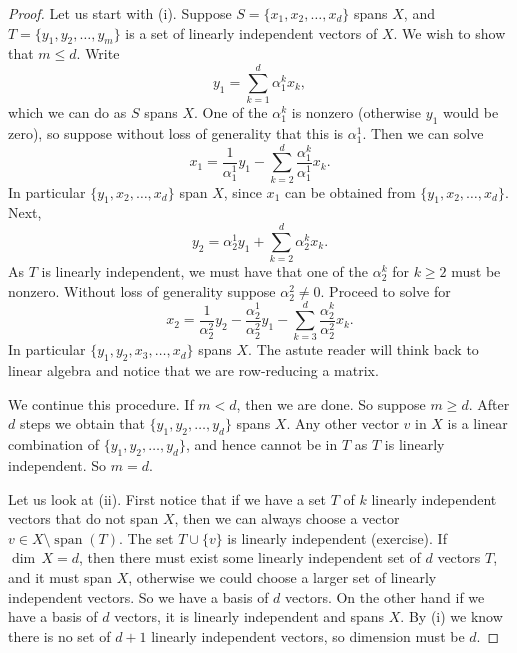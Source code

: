 \documentclass[12pt]{book}
\newcommand{\spn}{\operatorname{span}}
\theoremstyle{plain}
\theoremstyle{remark}
\theoremstyle{definition}
\theoremstyle{exercise}
\theoremstyle{example}
\begin{document}
\begin{proof}
Let us start with (i).
Suppose $S = \{ x_1 , x_2, \ldots, x_d \}$ spans $X$, and
$T = \{ y_1, y_2, \ldots, y_m \}$ is a set of linearly independent
vectors of $X$.  We wish to show that $m \leq d$.
Write
\begin{equation*}
y_1 = \sum_{k=1}^d \alpha_1^k x_k ,
\end{equation*}
which we can do as $S$ spans $X$.  One of the
$\alpha_1^k$ is nonzero (otherwise $y_1$ would be zero),
so suppose without loss of generality that this
is $\alpha_1^1$.  Then we can solve
\begin{equation*}
x_1 = \frac{1}{\alpha_1^1} y_1 - \sum_{k=2}^d \frac{\alpha_1^k}{\alpha_1^1} x_k .
\end{equation*}
In particular $\{ y_1 , x_2, \ldots, x_d \}$ span $X$, since $x_1$ can be
obtained from $\{ y_1 , x_2, \ldots, x_d \}$.  Next,
\begin{equation*}
y_2 = \alpha_2^1 y_1 + \sum_{k=2}^d \alpha_2^k x_k .
\end{equation*}
As $T$ is linearly independent, we must have that one of the $\alpha_2^k$
for $k \geq 2$ must be nonzero.  Without loss of generality suppose 
$\alpha_2^2 \not= 0$.  Proceed to solve for 
\begin{equation*}
x_2 = \frac{1}{\alpha_2^2} y_2 - \frac{\alpha_2^1}{\alpha_2^2} y_1 - \sum_{k=3}^d \frac{\alpha_2^k}{\alpha_2^2} x_k .
\end{equation*}
In particular 
$\{ y_1 , y_2, x_3, \ldots, x_d \}$ spans $X$.
The astute reader will think back to linear algebra and notice that we are
row-reducing a matrix.

We continue this procedure.  If $m < d$, then we are done.  So suppose
$m \geq d$.
After $d$ steps we obtain that 
$\{ y_1 , y_2, \ldots, y_d \}$ spans $X$.  Any
other vector $v$ in $X$ is a linear combination of
$\{ y_1 , y_2, \ldots, y_d \}$, and hence cannot be in $T$ as $T$ is
linearly independent.  So $m = d$.

Let us look at (ii).
First notice that if we have a set $T$ of $k$ linearly independent vectors
that do not span $X$, then we can always choose a vector $v \in X \setminus
\spn (T)$.  The set $T \cup \{ v \}$ is linearly independent (exercise).
If $\dim \, X = d$,
then there must exist some linearly independent set of $d$ vectors $T$,
and it must span $X$, otherwise we could choose a larger set of linearly
independent vectors.  So we have a basis of $d$ vectors.
On the other hand if we have a basis of $d$ vectors,
it is linearly independent and spans $X$.  By (i) we know
there is no set of $d+1$ linearly independent vectors, so dimension must be $d$.


\end{proof}
\end{document}
